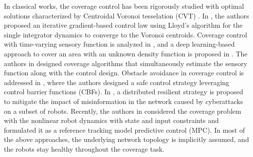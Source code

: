 In classical works, the coverage control has been rigorously studied with optimal solutions characterized by Centroidal Voronoi tesselation (CVT) \cite{du2006convergence}. In \cite{cortes2004coverage}, the authors proposed an iterative gradient-based control law using Lloyd's algorithm \cite{lloyd1982least} for the single integrator dynamics to converge to the Voronoi centroids. Coverage control with time-varying sensory function is analyzed in \cite{lee2015multirobot}, and a deep learning-based approach to cover an area with an unknown density function is proposed in \cite{rastgoftar2025deep}. The authors in \cite{schwager2009decentralized,todescato2017multi,rickenbach2024active} designed coverage algorithms that simultaneously estimate the sensory function along with the control design. Obstacle avoidance in coverage control is addressed in \cite{bai2021adaptive, bai2023safe}, where the authors designed a safe control strategy leveraging control barrier functions (CBFs). In \cite{rezaee2024resilient}, a distributed resilient strategy is proposed to mitigate the impact of misinformation in the network caused by cyberattacks on a subset of robots. Recently, the authors in \cite{carron2020model, rickenbach2024active} considered the coverage problem with the nonlinear robot dynamics with state and input constraints and formulated it as a reference tracking model predictive control (MPC). In most of the above approaches, the underlying network topology is implicitly assumed, and the robots stay healthy throughout the coverage task.

